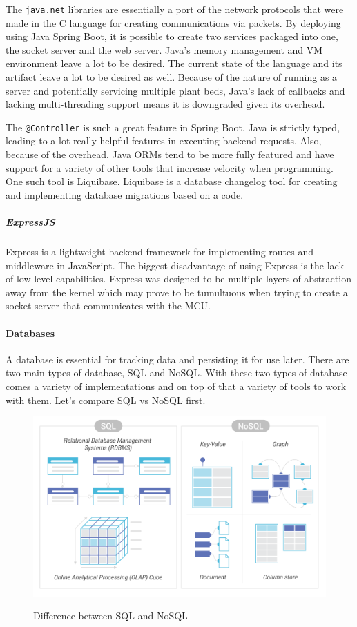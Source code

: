 The \verb|java.net| libraries are essentially a port of the network protocols that were made in the C language for creating communications via packets. By deploying using Java Spring Boot, it is possible to create two services packaged into one, the socket server and the web server. Java's memory management and VM environment leave a lot to be desired. The current state of the language and its artifact leave a lot to be desired as well. Because of the nature of running as a server and potentially servicing multiple plant beds, Java's lack of callbacks and lacking multi-threading support means it is downgraded given its overhead.

The \verb|@Controller| is such a great feature in Spring Boot. Java is strictly typed, leading to a lot really helpful features in executing backend requests. Also, because of the overhead, Java ORMs tend to be more fully featured and have support for a variety of other tools that increase velocity when programming. One such tool is Liquibase. Liquibase is a database changelog tool for creating and implementing database migrations based on a code.

\subparagraph{ExpressJS}
Express is a lightweight backend framework for implementing routes and middleware in JavaScript. The biggest disadvantage of using Express is the lack of low-level capabilities. Express was designed to be multiple layers of abstraction away from the kernel which may prove to be tumultuous when trying to create a socket server that communicates with the MCU.
\paragraph{Databases}
A database is essential for tracking data and persisting it for use later. There are two main types of database, SQL and NoSQL. With these two types of database comes a variety of implementations and on top of that a variety of tools to work with them. Let's compare SQL vs NoSQL first.

\begin{figure}[H]
    \caption{Difference between SQL and NoSQL}
    \centering
    \includegraphics[width=\textwidth]{images/SQL vs NoSQL.png}
    \label{fig:sql_vs_nosql}
\end{figure}

